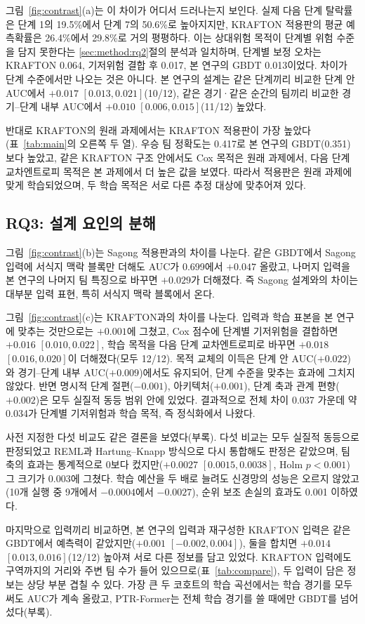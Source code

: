 그림~\ref{fig:contrast}(a)는 이 차이가 어디서 드러나는지 보인다.
실제 다음 단계 탈락률은 단계 1의 19.5\%에서 단계 7의 50.6\%로 높아지지만, KRAFTON 적용판의 평균 예측확률은 26.4\%에서 29.8\%로 거의 평평하다.
이는 상대위험 목적이 단계별 위험 수준을 담지 못한다는 \ref{sec:method:rq2}절의 분석과 일치하며, 단계별 보정 오차는 KRAFTON 0.064, 기저위험 결합 후 0.017, 본 연구의 GBDT 0.013이었다.
차이가 단계 수준에서만 나오는 것은 아니다. 본 연구의 설계는 같은 단계끼리 비교한 단계 안 AUC에서 $+0.017$ $[0.013, 0.021]$(10/12), 같은 경기·같은 순간의 팀끼리 비교한 경기--단계 내부 AUC에서 $+0.010$ $[0.006, 0.015]$(11/12) 높았다.

반대로 KRAFTON의 원래 과제에서는 KRAFTON 적용판이 가장 높았다(표~\ref{tab:main}의 오른쪽 두 열).
우승 팀 정확도는 0.417로 본 연구의 GBDT(0.351)보다 높았고, 같은 KRAFTON 구조 안에서도 Cox 목적은 원래 과제에서, 다음 단계 교차엔트로피 목적은 본 과제에서 더 높은 값을 보였다.
따라서 적용판은 원래 과제에 맞게 학습되었으며, 두 학습 목적은 서로 다른 추정 대상에 맞추어져 있다.

\subsection{RQ3: 설계 요인의 분해}
\label{sec:results:rq3}

그림~\ref{fig:contrast}(b)는 Sagong 적용판과의 차이를 나눈다.
같은 GBDT에서 Sagong 입력에 서식지 맥락 블록만 더해도 AUC가 0.699에서 $+0.047$ 올랐고, 나머지 입력을 본 연구의 나머지 팀 특징으로 바꾸면 $+0.029$가 더해졌다.
즉 Sagong 설계와의 차이는 대부분 입력 표현, 특히 서식지 맥락 블록에서 온다.

그림~\ref{fig:contrast}(c)는 KRAFTON과의 차이를 나눈다.
입력과 학습 표본을 본 연구에 맞추는 것만으로는 $+0.001$에 그쳤고, Cox 점수에 단계별 기저위험을 결합하면 $+0.016$ $[0.010, 0.022]$, 학습 목적을 다음 단계 교차엔트로피로 바꾸면 $+0.018$ $[0.016, 0.020]$이 더해졌다(모두 12/12).
목적 교체의 이득은 단계 안 AUC($+0.022$)와 경기--단계 내부 AUC($+0.009$)에서도 유지되어, 단계 수준을 맞추는 효과에 그치지 않았다.
반면 명시적 단계 절편($-0.001$), 아키텍처($+0.001$), 단계 축과 관계 편향($+0.002$)은 모두 실질적 동등 범위 안에 있었다.
결과적으로 전체 차이 0.037 가운데 약 0.034가 단계별 기저위험과 학습 목적, 즉 정식화에서 나왔다.



사전 지정한 다섯 비교도 같은 결론을 보였다(부록).
다섯 비교는 모두 실질적 동등으로 판정되었고 REML과 Hartung--Knapp 방식으로 다시 통합해도 판정은 같았으며, 팀 축의 효과는 통계적으로 0보다 컸지만($+0.0027$ $[0.0015, 0.0038]$, Holm $p<0.001$) 그 크기가 0.003에 그쳤다.
학습 예산을 두 배로 늘려도 신경망의 성능은 오르지 않았고(10개 실행 중 9개에서 $-0.0004$에서 $-0.0027$), 순위 보조 손실의 효과도 0.001 이하였다.

마지막으로 입력끼리 비교하면, 본 연구의 입력과 재구성한 KRAFTON 입력은 같은 GBDT에서 예측력이 같았지만($+0.001$ $[-0.002, 0.004]$), 둘을 합치면 $+0.014$ $[0.013, 0.016]$(12/12) 높아져 서로 다른 정보를 담고 있었다. KRAFTON 입력에도 구역까지의 거리와 주변 팀 수가 들어 있으므로(표~\ref{tab:compare}), 두 입력이 담은 정보는 상당 부분 겹칠 수 있다.
가장 큰 두 코호트의 학습 곡선에서는 학습 경기를 모두 써도 AUC가 계속 올랐고, PTR-Former는 전체 학습 경기를 쓸 때에만 GBDT를 넘어섰다(부록).
